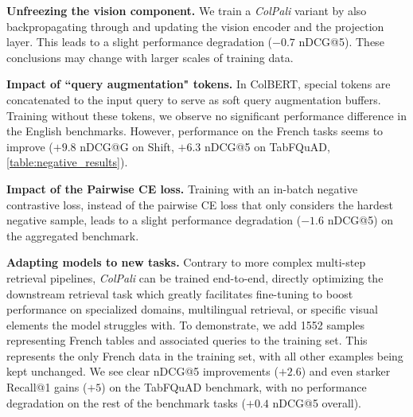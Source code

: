 \noindent\textbf{Unfreezing the vision component.} We train a \textit{ColPali} variant by also backpropagating through and updating the vision encoder and the projection layer. This leads to a slight performance degradation ($-0.7$ nDCG@5). These conclusions may change with larger scales of training data.

\noindent\textbf{Impact of ``query augmentation" tokens.} In ColBERT, special tokens are concatenated to the input query to serve as soft query augmentation buffers. Training without these tokens, we observe no significant performance difference in the English benchmarks. However, performance on the French tasks seems to improve ($+9.8$ nDCG@G on Shift, $+6.3$ nDCG@5 on TabFQuAD, \autoref{table:negative_results}).


\noindent\textbf{Impact of the Pairwise CE loss.} Training with an in-batch negative contrastive loss, instead of the pairwise CE loss that only considers the hardest negative sample, leads to a slight performance degradation ($-1.6$ nDCG@5) on the aggregated benchmark.

\noindent\textbf{Adapting models to new tasks.} Contrary to more complex multi-step retrieval pipelines, \textit{ColPali} can be trained end-to-end, directly optimizing the downstream retrieval task which greatly facilitates fine-tuning to boost performance on specialized domains, multilingual retrieval, or specific visual elements the model struggles with. To demonstrate, we add 1552 samples representing French tables and associated queries to the training set. This represents the only French data in the training set, with all other examples being kept unchanged. We see clear nDCG@5 improvements ($+2.6$) and even starker Recall@1 gains ($+5$) on the TabFQuAD benchmark, with no performance degradation on the rest of the benchmark tasks ($+0.4$ nDCG@5 overall).


